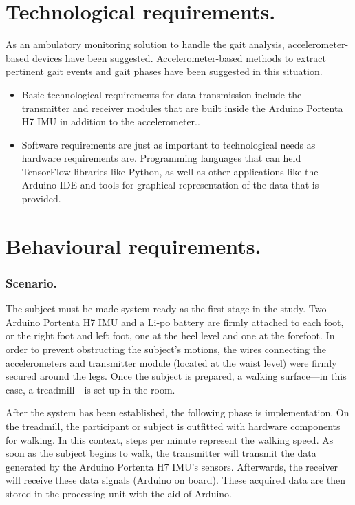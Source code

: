 \section{Technological requirements.}
As an ambulatory monitoring solution to handle the gait analysis, accelerometer-based devices have been suggested. Accelerometer-based methods to extract pertinent gait events and gait phases have been suggested in this situation.

\begin{itemize}
\item Basic technological requirements for data transmission include the transmitter and receiver modules that are built inside the Arduino Portenta H7 IMU in addition to the accelerometer..

\item Software requirements are just as important to technological needs as hardware requirements are. Programming languages that can held TensorFlow libraries like Python, as well as other applications like the Arduino IDE and tools for graphical representation of the data that is provided.

\end{itemize}

\section{Behavioural requirements.}
\subsubsection{Scenario.}
The subject must be made system-ready as the first stage in the study. Two Arduino Portenta H7 IMU and a Li-po battery are firmly attached to each foot, or the right foot and left foot, one at the heel level and one at the forefoot. In order to prevent obstructing the subject's motions, the wires connecting the accelerometers and transmitter module (located at the waist level) were firmly secured around the legs. Once the subject is prepared, a walking surface—in this case, a treadmill—is set up in the room.
\bigskip

After the system has been established, the following phase is implementation. On the treadmill, the participant or subject is outfitted with hardware components for walking. In this context, steps per minute represent the walking speed. As soon as the subject begins to walk, the transmitter will transmit the data generated by the Arduino Portenta H7 IMU's sensors. Afterwards, the receiver will receive these data signals (Arduino on board). These acquired data are then stored in the processing unit with the aid of Arduino.
\bigskip

